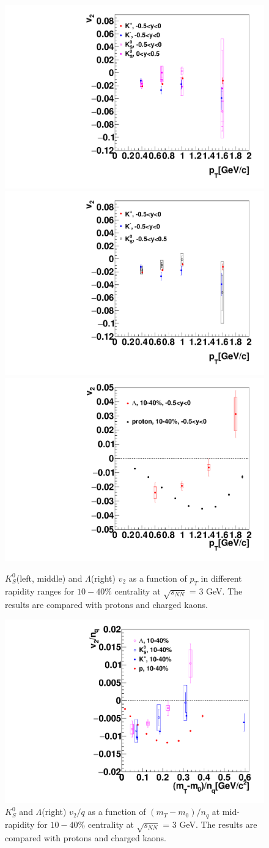 \begin{figure}[h]
\includegraphics[width=0.32\linewidth]{chapterX/fig/q_v2_k_pt.pdf}
\includegraphics[width=0.32\linewidth]{chapterX/fig/q_v2_k_pt_check.pdf}
\includegraphics[width=0.32\linewidth]{chapterX/fig/data_v2_ld_pt.pdf}
\caption{$K^0_S$(left, middle) and $\Lambda$(right) $v_2$ as a function of $p_{T}$ in different rapidity ranges for $10-40\%$ centrality at $\sqrt{s_{NN}}$ = 3 GeV. The results are compared with protons and charged kaons.}
\label{ldks_dv2dpt}
\end{figure}


\begin{figure}[h]
\includegraphics[width=0.80\linewidth]{chapterX/fig/data_v2_ld_ks_mt.pdf}
\caption{$K^0_S$ and $\Lambda$(right) $v_2/q$ as a function of $(m_{T}-m_{0})/n_{q}$ at mid-rapidity for $10-40\%$ centrality at $\sqrt{s_{NN}}$ = 3 GeV. The results are compared with protons and charged kaons.}
\label{ldks_dv2dmt}
\end{figure}
